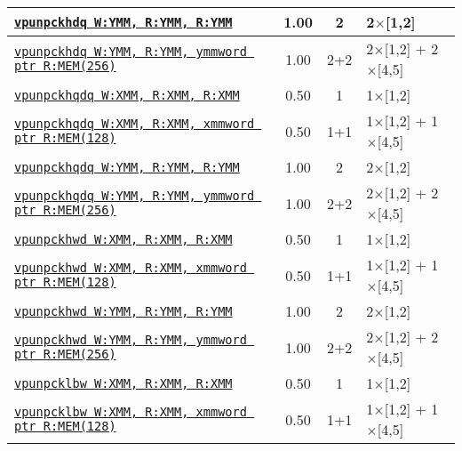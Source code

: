 \documentclass[a4paper,english,fontsize=9]{scrartcl}
\begin{document}
\begin{longtable}{p{}ccL{.25\textwidth}}
  \midrule
  \texttt{\href{https://felixcloutier.com/x86/PUNPCKHBW:PUNPCKHWD:PUNPCKHDQ:PUNPCKHQDQ.html}{vpunpckhdq W:YMM, R:YMM, R:YMM}} & 1.00 & 2 & 2\(\times\)[1,2] \\
  \midrule
  \texttt{\href{https://felixcloutier.com/x86/PUNPCKHBW:PUNPCKHWD:PUNPCKHDQ:PUNPCKHQDQ.html}{vpunpckhdq W:YMM, R:YMM, ymmword ptr R:MEM(256)}} & 1.00 & 2+2 & 2\(\times\)[1,2] + 2\(\times\)[4,5] \\
  \midrule
  \texttt{\href{https://felixcloutier.com/x86/PUNPCKHBW:PUNPCKHWD:PUNPCKHDQ:PUNPCKHQDQ.html}{vpunpckhqdq W:XMM, R:XMM, R:XMM}} & 0.50 & 1 & 1\(\times\)[1,2] \\
  \midrule
  \texttt{\href{https://felixcloutier.com/x86/PUNPCKHBW:PUNPCKHWD:PUNPCKHDQ:PUNPCKHQDQ.html}{vpunpckhqdq W:XMM, R:XMM, xmmword ptr R:MEM(128)}} & 0.50 & 1+1 & 1\(\times\)[1,2] + 1\(\times\)[4,5] \\
  \midrule
  \texttt{\href{https://felixcloutier.com/x86/PUNPCKHBW:PUNPCKHWD:PUNPCKHDQ:PUNPCKHQDQ.html}{vpunpckhqdq W:YMM, R:YMM, R:YMM}} & 1.00 & 2 & 2\(\times\)[1,2] \\
  \midrule
  \texttt{\href{https://felixcloutier.com/x86/PUNPCKHBW:PUNPCKHWD:PUNPCKHDQ:PUNPCKHQDQ.html}{vpunpckhqdq W:YMM, R:YMM, ymmword ptr R:MEM(256)}} & 1.00 & 2+2 & 2\(\times\)[1,2] + 2\(\times\)[4,5] \\
  \midrule
  \texttt{\href{https://felixcloutier.com/x86/PUNPCKHBW:PUNPCKHWD:PUNPCKHDQ:PUNPCKHQDQ.html}{vpunpckhwd W:XMM, R:XMM, R:XMM}} & 0.50 & 1 & 1\(\times\)[1,2] \\
  \midrule
  \texttt{\href{https://felixcloutier.com/x86/PUNPCKHBW:PUNPCKHWD:PUNPCKHDQ:PUNPCKHQDQ.html}{vpunpckhwd W:XMM, R:XMM, xmmword ptr R:MEM(128)}} & 0.50 & 1+1 & 1\(\times\)[1,2] + 1\(\times\)[4,5] \\
  \midrule
  \texttt{\href{https://felixcloutier.com/x86/PUNPCKHBW:PUNPCKHWD:PUNPCKHDQ:PUNPCKHQDQ.html}{vpunpckhwd W:YMM, R:YMM, R:YMM}} & 1.00 & 2 & 2\(\times\)[1,2] \\
  \midrule
  \texttt{\href{https://felixcloutier.com/x86/PUNPCKHBW:PUNPCKHWD:PUNPCKHDQ:PUNPCKHQDQ.html}{vpunpckhwd W:YMM, R:YMM, ymmword ptr R:MEM(256)}} & 1.00 & 2+2 & 2\(\times\)[1,2] + 2\(\times\)[4,5] \\
  \midrule
  \texttt{\href{https://felixcloutier.com/x86/PUNPCKLBW:PUNPCKLWD:PUNPCKLDQ:PUNPCKLQDQ.html}{vpunpcklbw W:XMM, R:XMM, R:XMM}} & 0.50 & 1 & 1\(\times\)[1,2] \\
  \midrule
  \texttt{\href{https://felixcloutier.com/x86/PUNPCKLBW:PUNPCKLWD:PUNPCKLDQ:PUNPCKLQDQ.html}{vpunpcklbw W:XMM, R:XMM, xmmword ptr R:MEM(128)}} & 0.50 & 1+1 & 1\(\times\)[1,2] + 1\(\times\)[4,5] \\

\end{longtable}
\end{document}

